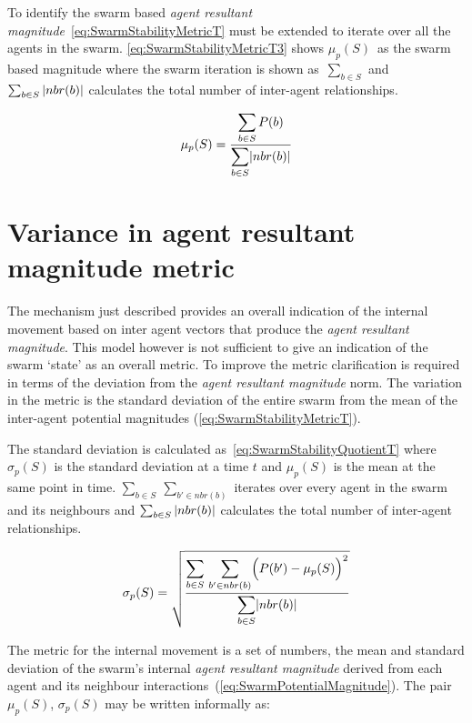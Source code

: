 To identify the swarm based \textit{agent resultant magnitude}~\autoref{eq:SwarmStabilityMetricT} must be extended to iterate over all the agents in the swarm. \autoref{eq:SwarmStabilityMetricT3} shows $\mu_p(S)$~as the swarm based magnitude where the swarm iteration is shown as~$\sum_{b \in S}$ and $\sum_{b \in S}\vert{nbr(b)}\vert$ calculates the total number of inter-agent relationships.

\begin{equation}
\label{eq:SwarmStabilityMetricT3}
\mu_p(S) = \frac{\mathlarger{\sum_{b \in S} P(b)}}{\mathlarger{\sum_{b \in S}}\card{nbr(b)}}
\end{equation}

\section{Variance in agent resultant magnitude metric}\label{Section:VarianceInPotential}
The mechanism just described provides an overall indication of the internal movement based on inter agent vectors that produce the \textit{agent resultant magnitude}. This model however is not sufficient to give an indication of the swarm `state' as an overall metric. To improve the metric clarification is required in terms of the deviation from the \textit{agent resultant magnitude} norm. The variation in the metric is the standard deviation of the entire swarm from the mean of the inter-agent potential magnitudes (\autoref{eq:SwarmStabilityMetricT}).

The standard deviation is calculated as~\autoref{eq:SwarmStabilityQuotientT} where $\sigma_p(S)$ is the standard deviation at a time $t$ and $\mu_p(S)$ is the mean at the same point in time. $\sum_{b \in S}~\sum_{b' \in nbr(b)}$ iterates over every agent in the swarm and its neighbours and $\sum_{b \in S}\vert{nbr(b)}\vert$ calculates the total number of inter-agent relationships.

\begin{equation}
\label{eq:SwarmStabilityQuotientT}
\sigma_p(S) = \sqrt{\frac{\mathlarger{\sum_{b \in S}}~\mathlarger{\sum_{b' \in nbr(b)}}\Big(P(b')-\mu_p(S)\Big)^2}{\mathlarger{\sum_{b \in S}}\card{nbr(b)}}}
\end{equation}

The metric for the internal movement is a set of numbers, the mean and standard deviation of the swarm's internal \textit{agent resultant magnitude} derived from each agent and its neighbour interactions~(\autoref{eq:SwarmPotentialMagnitude}). The pair $\mu_p(S)$, $\sigma_p(S)$ may be written informally as: 


